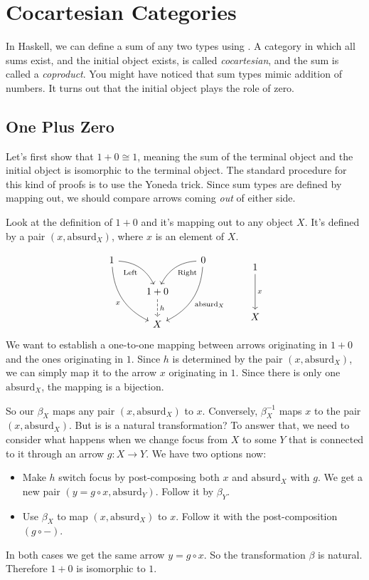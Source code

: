 \documentclass[DaoFP]{subfiles}
\begin{document}
\section{Cocartesian Categories}

In Haskell, we can define a sum of any two types using . A category in which all sums exist, and the initial object exists, is called \emph{cocartesian}, and the sum is called a \emph{coproduct}. You might have noticed that sum types mimic addition of numbers. It turns out that the initial object plays the role of zero. 



\subsection{One Plus Zero}
Let's first show that $1 + 0 \cong 1$, meaning the sum of the terminal object and the initial object is isomorphic to the terminal object. The standard procedure for this kind of proofs is to use the Yoneda trick. Since sum types are defined by mapping out, we should compare arrows coming \emph{out} of either side. 
 
Look at the definition of $1 + 0$ and it's mapping out to any object $X$. It's defined by a pair $(x, \text{absurd}_X)$, where $x$ is an element of $X$. 

\[
 \begin{tikzcd}
 1
 \arrow[dr,  bend left, "\text{Left}"']
 \arrow[ddr, bend right, "x"']
 && 0
 \arrow[dl, bend right, "\text{Right}"]
 \arrow[ddl, bend left, "\text{absurd}_X"]
 \\
&1 + 0
\arrow[d, dashed, "h"]
\\
& X
 \end{tikzcd}
 \qquad
 \begin{tikzcd}
 1
 \arrow[dd, "x"]
 \\
 \\
 X
 \end{tikzcd}
\]
We want to establish a one-to-one mapping between arrows originating in $1+0$ and the ones originating in $1$. Since $h$ is determined by the pair $(x, \text{absurd}_X)$, we can simply map it to the arrow $x$ originating in $1$. Since there is only one $\text{absurd}_X$, the mapping is a bijection. 

So our $\beta_X$ maps any pair $(x, \text{absurd}_X)$ to $x$. Conversely, $\beta^{-1}_X$ maps $x$ to the pair $(x, \text{absurd}_X)$. But is is a natural transformation? To answer that, we need to consider what happens when we change focus from $X$ to some $Y$ that is connected to it through an arrow $g \colon X \to Y$. We have two options now:
\begin{itemize}
\item Make $h$ switch focus by post-composing both $x$ and $\text{absurd}_X$ with $g$. We get a new pair $(y = g \circ x, \text{absurd}_Y)$. Follow it by $\beta_Y$.
\item Use $\beta_X$ to map $(x, \text{absurd}_X)$ to $x$. Follow it with the post-composition $(g \circ -)$. 
\end{itemize}
In both cases we get the same arrow $y = g \circ x$. So the transformation $\beta$ is natural. Therefore $1 + 0$ is isomorphic to $1$.
\end{document}
